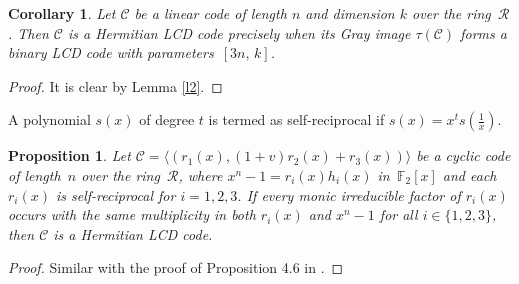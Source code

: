 \documentclass[pdflatex,sn-mathphys-num]{sn-jnl}%
\theoremstyle{thmstyleone}%
\newtheorem{proposition}[theorem]{Proposition}%
\theoremstyle{thmstyletwo}%
\newtheorem{corollary}{Corollary}%
\theoremstyle{thmstylethree}%
\begin{document}
\begin{corollary}\label{corollary1}
Let $\mathcal{C}$ be a linear code of length $n$ and dimension $k$ over the ring~$\mathcal{R}$.
Then $\mathcal{C}$ is a Hermitian LCD code precisely when its Gray image $\tau(\mathcal{C})$ forms a binary LCD code with parameters~$[3n,\,k]$.
\end{corollary}

\begin{proof}
It is clear by Lemma \ref{l2}.
\end{proof}

\noindent A polynomial $s(x)$ of degree $t$ is termed as self-reciprocal if $s(x)=x^ts(\frac{1}{x})$.

\begin{proposition}\label{prop14}
Let $\mathcal{C} = \langle (r_1(x), (1+v)r_2(x) + r_3(x)) \rangle$ be a cyclic code of length~$n$ over the ring~$\mathcal{R}$,
where $x^n - 1 = r_i(x)h_i(x)$ in~$\mathbb{F}_2[x]$ and each $r_i(x)$ is self-reciprocal for $i = 1,2,3$.
If every monic irreducible factor of $r_i(x)$ occurs with the same multiplicity in both $r_i(x)$ and $x^n - 1$ for all $i \in \{1,2,3\}$,
then $\mathcal{C}$ is a Hermitian LCD code.
\end{proposition}

\begin{proof}
Similar with the proof of Proposition 4.6 in \cite{euclideansum}.
\end{proof}
\end{document}
